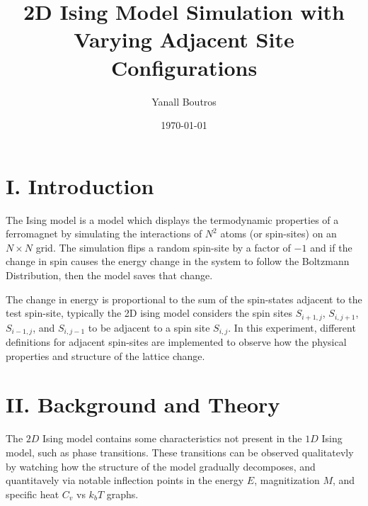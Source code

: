 \documentclass{article}
\begin{document}
\title{2D Ising Model Simulation with Varying Adjacent Site Configurations}
\author{Yanall Boutros}
\date{\today}
\maketitle
\section*{I. Introduction}
\indent \indent The Ising model is a model which displays the termodynamic
properties of a ferromagnet by simulating the interactions of $N^2$  atoms
(or spin-sites) on an $N\times N$ grid. The simulation flips a random spin-site
by a factor of $-1$ and if the change in spin causes the energy change in the
system to follow the Boltzmann Distribution, then the model saves that change.

\indent The change in energy is proportional to the sum of the spin-states
adjacent to the test spin-site, typically the 2D ising model considers the 
spin sites $S_{i+1, j}$, $S_{i, j+1}$, $S_{i-1, j}$, and $S_{i, j-1}$ to 
be adjacent to a spin site $S_{i, j}$. In this experiment, different definitions
for adjacent spin-sites are implemented to observe how the physical properties
and structure of the lattice change.
\section*{II. Background and Theory}
\indent \indent The $2D$ Ising model contains some characteristics not present
in the $1D$ Ising model, such as phase transitions. These transitions can be
observed qualitatevly by watching how the structure of the model gradually 
decomposes, and quantitavely via notable inflection points in the energy $E$,
magnitization $M$, and specific heat $C_v$ vs $k_bT$ graphs.
\end{document}
